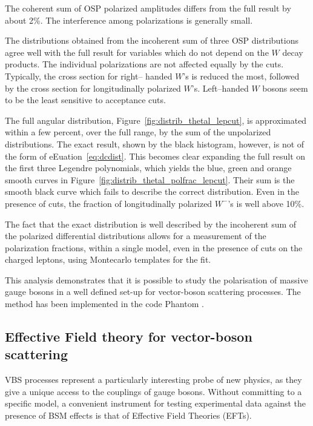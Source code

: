 The coherent sum of  OSP polarized amplitudes differs from the full result by about 2\%.
The interference among polarizations is generally small. 
 
The distributions obtained from the incoherent sum of three OSP distributions agree  well with the full 
result for variables which do not depend on the $W$ decay products.
The individual polarizations are not affected equally by the cuts. Typically, the cross section for right--
handed $W$'s 
is reduced the most, followed by the cross section for longitudinally polarized $W$'s. Left--handed $W$ 
bosons seem to be the least sensitive to acceptance cuts.

The full angular distribution, Figure~\ref{fig:distrib_thetal_lepcut},
is approximated within a few percent, over the full range, by the sum of the 
unpolarized distributions. 
The exact result, shown by the black histogram, however, is not of the form of eEuation~\ref{eq:dcdist}.
This becomes clear expanding the full result on the first three Legendre polynomials,
which yields the blue, green and orange smooth 
curves in Figure~\ref{fig:distrib_thetal_polfrac_lepcut}. Their sum is the smooth black curve which fails to describe 
the correct distribution.
Even in the presence of cuts, the fraction of longitudinally polarized $W^-$'s is well above 10\%.

The fact that the exact distribution is well described by the incoherent sum of the polarized differential 
distributions
allows for a measurement of the polarization fractions, within a single model,
even in the presence of cuts on the charged 
leptons, using Montecarlo templates for the fit. 

This analysis demonstrates that it is possible to study the polarisation of massive gauge
bosons in a well defined set-up for vector-boson scattering processes. The  method has been 
implemented in the code Phantom \cite{Ballestrero:2007xq}.


\subsection{Effective Field theory for vector-boson scattering}

VBS processes represent a particularly interesting probe of new physics, as they give a unique access to the couplings of gauge bosons.
Without committing to a specific model, a convenient instrument for testing experimental data against the presence of BSM effects is that of Effective Field Theories (EFTs).


